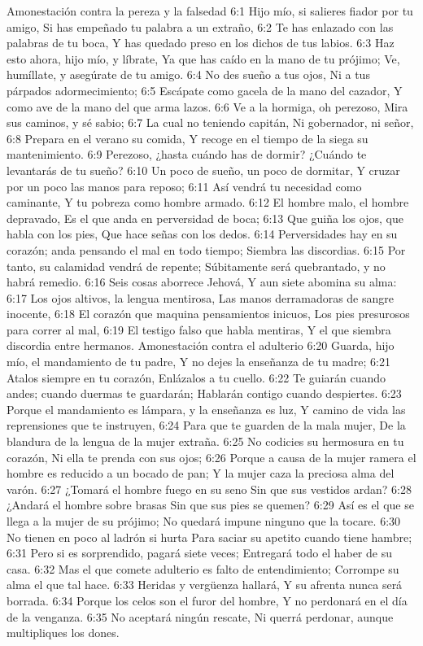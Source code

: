 Amonestación contra la pereza y la falsedad  
6:1 Hijo mío, si salieres fiador por tu amigo,  
Si has empeñado tu palabra a un extraño,  
6:2 Te has enlazado con las palabras de tu boca,  
Y has quedado preso en los dichos de tus labios.  
6:3 Haz esto ahora, hijo mío, y líbrate,  
Ya que has caído en la mano de tu prójimo;  
Ve, humíllate, y asegúrate de tu amigo.  
6:4 No des sueño a tus ojos,  
Ni a tus párpados adormecimiento;  
6:5 Escápate como gacela de la mano del cazador,  
Y como ave de la mano del que arma lazos.  
6:6 Ve a la hormiga, oh perezoso,  
Mira sus caminos, y sé sabio;  
6:7 La cual no teniendo capitán,  
Ni gobernador, ni señor,  
6:8 Prepara en el verano su comida,  
Y recoge en el tiempo de la siega su mantenimiento.  
6:9 Perezoso, ¿hasta cuándo has de dormir?  
¿Cuándo te levantarás de tu sueño?  
6:10 Un poco de sueño, un poco de dormitar, 
Y cruzar por un poco las manos para reposo;  
6:11 Así vendrá tu necesidad como caminante,  
Y tu pobreza como hombre armado. 
6:12 El hombre malo, el hombre depravado,  
Es el que anda en perversidad de boca;  
6:13 Que guiña los ojos, que habla con los pies,  
Que hace señas con los dedos.  
6:14 Perversidades hay en su corazón; anda pensando el mal en todo tiempo;  
Siembra las discordias.  
6:15 Por tanto, su calamidad vendrá de repente;  
Súbitamente será quebrantado, y no habrá remedio.  
6:16 Seis cosas aborrece Jehová,  
Y aun siete abomina su alma:  
6:17 Los ojos altivos, la lengua mentirosa,  
Las manos derramadoras de sangre inocente,  
6:18 El corazón que maquina pensamientos inicuos,  
Los pies presurosos para correr al mal,  
6:19 El testigo falso que habla mentiras,  
Y el que siembra discordia entre hermanos.  
Amonestación contra el adulterio  
6:20 Guarda, hijo mío, el mandamiento de tu padre,  
Y no dejes la enseñanza de tu madre;  
6:21 Atalos siempre en tu corazón,  
Enlázalos a tu cuello.  
6:22 Te guiarán cuando andes; cuando duermas te guardarán;  
Hablarán contigo cuando despiertes.  
6:23 Porque el mandamiento es lámpara, y la enseñanza es luz,  
Y camino de vida las reprensiones que te instruyen,  
6:24 Para que te guarden de la mala mujer,  
De la blandura de la lengua de la mujer extraña.  
6:25 No codicies su hermosura en tu corazón,  
Ni ella te prenda con sus ojos;  
6:26 Porque a causa de la mujer ramera el hombre es reducido a un bocado de pan;  
Y la mujer caza la preciosa alma del varón.  
6:27 ¿Tomará el hombre fuego en su seno  
Sin que sus vestidos ardan?  
6:28 ¿Andará el hombre sobre brasas  
Sin que sus pies se quemen?  
6:29 Así es el que se llega a la mujer de su prójimo;  
No quedará impune ninguno que la tocare.  
6:30 No tienen en poco al ladrón si hurta  
Para saciar su apetito cuando tiene hambre;  
6:31 Pero si es sorprendido, pagará siete veces;  
Entregará todo el haber de su casa.  
6:32 Mas el que comete adulterio es falto de entendimiento;  
Corrompe su alma el que tal hace.  
6:33 Heridas y vergüenza hallará,  
Y su afrenta nunca será borrada.  
6:34 Porque los celos son el furor del hombre,  
Y no perdonará en el día de la venganza.  
6:35 No aceptará ningún rescate,  
Ni querrá perdonar, aunque multipliques los dones.  

